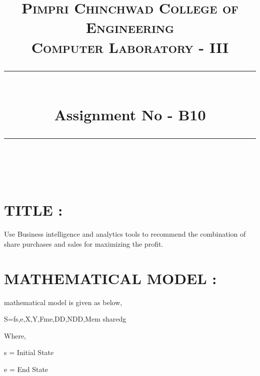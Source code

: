 \documentclass[a4paper,12pt]{article}
\title{
	\normalfont \normalsize 
	\textsc{Pimpri Chinchwad College of Engineering \\ 
		Computer Laboratory - III} \\
	[10pt] 
	\rule{\linewidth}{0.5pt} \\[6pt] 
	\huge Assignment No - B10 \\
	\rule{\linewidth}{2pt}  \\[10pt]
}
\author{}
\date{\normalsize}
\newenvironment{codefont}{\fontfamily{ccr}\selectfont}{\par}
\begin{document}
	\maketitle
	


\section{TITLE : }   Use Business intelligence and analytics tools to recommend the combination of share purchases and sales for maximizing the profit.

\section{MATHEMATICAL MODEL : }

{\rmfamily
	mathematical model is given as below,}


\bigskip

\textrm{S=fs,e,X,Y,Fme,DD,NDD,Mem sharedg}


\bigskip

{\rmfamily
	Where,}

{\rmfamily
	s = Initial State}

{\rmfamily
	e = End State}
\end{document}
